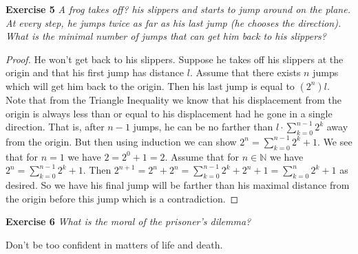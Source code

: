 \documentclass{article}
\begin{document}
\begin{flushleft}
\textbf{Exercise 5}
\textsl{A frog takes off? his slippers and starts to jump around on the plane. At every step, he jumps twice as far as his last jump (he chooses the direction). What is the minimal number of jumps that can get him back to his slippers?}
\begin{proof}
He won't get back to his slippers. Suppose he takes off his slippers at the origin and that his first jump has distance $l$. Assume that there exists $n$ jumps which will get him back to the origin. Then his last jump is equal to $(2^n)l$. Note that from the Triangle Inequality we know that his displacement from the origin is always less than or equal to his displacement had he gone in a single direction. That is, after $n-1$ jumps, he can be no farther than $l \cdot \sum_{k=0}^{n-1} 2^k$ away from the origin. But then using induction we can show $2^n = \sum_{k=0}^{n-1} 2^k + 1$. We see that for $n=1$ we have $2 = 2^0 + 1 = 2$. Assume that for $n \in \mathbb{N}$ we have $2^n = \sum_{k=0}^{n-1} 2^k + 1$. Then $2^{n+1} = 2^n + 2^n = \sum_{k=0}^{n-1} 2^k + 2^n + 1 = \sum_{k=0}^{n} 2^k + 1$ as desired. So we have his final jump will be farther than his maximal distance from the origin before this jump which is a contradiction.
\end{proof}

\textbf{Exercise 6}
\textsl{What is the moral of the prisoner's dilemma?}\newline

Don't be too confident in matters of life and death.

\end{flushleft}
\end{document}
